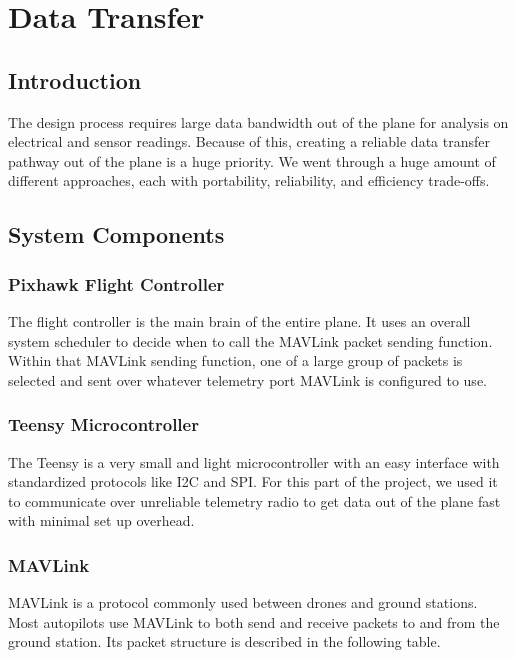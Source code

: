 \documentclass[12pt,journal,compsoc]{IEEEtran}
\begin{document}
\section{Data Transfer}
\subsection{Introduction}
The design process requires large data bandwidth out of the plane for analysis on electrical and sensor readings. Because of this, creating a reliable data transfer pathway out of the plane is a huge priority. We went through a huge amount of different approaches, each with portability, reliability, and efficiency trade-offs.

\subsection{System Components}

\subsubsection{Pixhawk Flight Controller}
The flight controller is the main brain of the entire plane. It uses an overall system scheduler to decide when to call the MAVLink packet sending function. Within that MAVLink sending function, one of a large group of packets is selected and sent over whatever telemetry port MAVLink is configured to use.

\subsubsection{Teensy Microcontroller}
The Teensy is a very small and light microcontroller with an easy interface with standardized protocols like I2C and SPI. For this part of the project, we used it to communicate over unreliable telemetry radio to get data out of the plane fast with minimal set up overhead.

\subsubsection{MAVLink}
MAVLink is a protocol commonly used between drones and ground stations. Most autopilots use MAVLink to both send and receive packets to and from the ground station. Its packet structure is described in the following table.
\end{document}
